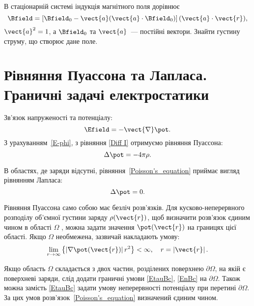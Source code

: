 \begin{problem}
В стаціонарній системі індукція магнітного поля дорівнює
\[
	\Bfield = \left[ \Bfield_0 - \vect{a}(\vect{a} \cdot \Bfield_0)\right]  (\vect{a}\cdot \vect{r}),
\]
$\vect{a}^2 = 1$, а $\Bfield_0$ та $\vect{a}$~--- постійні вектори. Знайти густину струму, що створює дане поле.
\end{problem}

\section{Рівняння Пуассона та Лапласа. Граничні задачі електростатики}

\begin{Theory}

	Зв'язок напруженості та потенціалу:
	\begin{equation}\label{E-phi}
		\Efield = - \vect{\nabla}\pot.
	\end{equation}
	З урахуванням~\eqref{E-phi}, з рівняння \eqref{Diff I}  отримуємо рівняння Пуассона:
	\begin{equation}\label{Poisson's_equation}
		\Delta\pot = -4\pi\rho.
	\end{equation}

	В областях, де заряди відсутні, рівняння~\eqref{Poisson's_equation} приймає вигляд рівнянням Лапласа:
	\begin{equation}\label{Laplace_equation}
		\Delta\pot = 0.
	\end{equation}

	Рівняння Пуассона само собою має безліч розв'язків. Для кусково-неперервного розподілу об’ємної густини заряду  $\rho(\vect{r})$, щоб визначити розв’язок єдиним чином в області $\Omega$ , можна задати значення $\pot(\vect{r})$  на границях цієї області. Якщо $\Omega$  необмежена, зазвичай накладають умову:
	\begin{equation}\label{eq:Efinity}
		\lim\limits_{r \to \infty } \left\{ {\left| {\nabla \pot({\vect{r}})} \right|{r^2}} \right\} < \infty ,\quad r = \left| {\vect{r}} \right|.
	\end{equation}

	Якщо область  $\Omega$ складається з двох частин, розділених поверхнею $\partial\Omega$, на якій є поверхневі заряди, слід додати граничні умови \eqref{EtauBc}, \eqref{EnBc} на $\partial\Omega$. Також можна замість \eqref{EtauBc} задати умову неперервності потенціалу при перетині $\partial\Omega$. За цих умов розв'язок~\eqref{Poisson's_equation} визначений єдиним чином.


\end{Theory}
